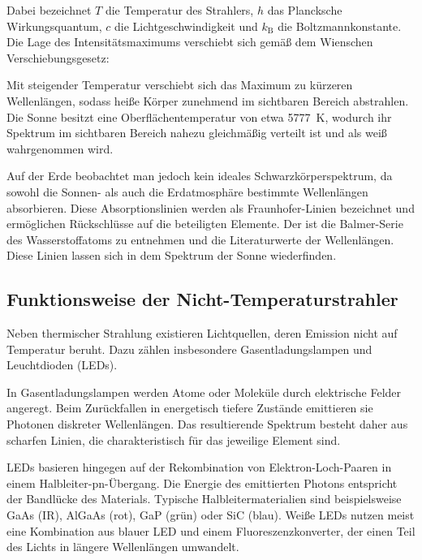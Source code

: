 
Dabei bezeichnet $T$ die Temperatur des Strahlers, $h$ das Plancksche Wirkungsquantum, $c$ die Lichtgeschwindigkeit und $k_\mathrm{B}$ die Boltzmannkonstante. Die Lage des Intensitätsmaximums verschiebt sich gemäß dem Wienschen Verschiebungsgesetz:


Mit steigender Temperatur verschiebt sich das Maximum zu kürzeren Wellenlängen, sodass heiße Körper zunehmend im sichtbaren Bereich abstrahlen. Die Sonne besitzt eine Oberflächentemperatur von etwa \SI{5777}{\kelvin}, wodurch ihr Spektrum im sichtbaren Bereich nahezu gleichmäßig verteilt ist und als weiß wahrgenommen wird.


Auf der Erde beobachtet man jedoch kein ideales Schwarzkörperspektrum, da sowohl die Sonnen- als auch die Erdatmosphäre bestimmte Wellenlängen absorbieren. Diese Absorptionslinien werden als Fraunhofer-Linien bezeichnet und ermöglichen Rückschlüsse auf die beteiligten Elemente. Der  ist die Balmer-Serie des Wasserstoffatoms zu entnehmen und die Literaturwerte der Wellenlängen. Diese Linien lassen sich in dem Spektrum der Sonne wiederfinden.

\subsection[Nicht-Temperaturstrahler]{Funktionsweise der Nicht-Temperaturstrahler}

Neben thermischer Strahlung existieren Lichtquellen, deren Emission nicht auf Temperatur beruht. Dazu zählen insbesondere Gasentladungslampen und Leuchtdioden (LEDs).

In Gasentladungslampen werden Atome oder Moleküle durch elektrische Felder angeregt. Beim Zurückfallen in energetisch tiefere Zustände emittieren sie Photonen diskreter Wellenlängen. Das resultierende Spektrum besteht daher aus scharfen Linien, die charakteristisch für das jeweilige Element sind.

LEDs basieren hingegen auf der Rekombination von Elektron-Loch-Paaren in einem Halbleiter-pn-Übergang. Die Energie des emittierten Photons entspricht der Bandlücke des Materials. Typische Halbleitermaterialien sind beispielsweise GaAs (IR), AlGaAs (rot), GaP (grün) oder SiC (blau). Weiße LEDs nutzen meist eine Kombination aus blauer LED und einem Fluoreszenzkonverter, der einen Teil des Lichts in längere Wellenlängen umwandelt.

